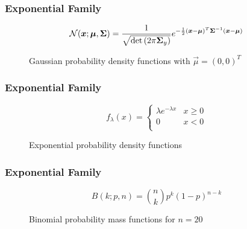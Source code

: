 \begin{frame}
  \frametitle{Exponential Family}

%
  \begin{displaymath}
    \mathcal{N}({\bm x}; {\bm \mu},{\bm \Sigma}) = \frac{1}{ \sqrt{ \det{(2 \pi \ensuremath{{\bm \Sigma}}_y})} } 
                    e^{-\frac{1}{2} ({\bm x} - {\bm \mu})^T {\bm \Sigma}^{-1} ({\bm x} - {\bm \mu})  } 
  \end{displaymath}
%
  \begin{figure}
    \centering
    \subfloat{
      \resizebox{.3\linewidth}{!}{
        
      }
    }
    \quad
    \subfloat{
      \resizebox{.3\linewidth}{!}{
        
      }
    }
    \quad
    \subfloat{
      \resizebox{.3\linewidth}{!}{
        
      }
    }

    \caption{Gaussian probability density functions with $\vec\mu = (0, 0)^T$}
  \end{figure}
\end{frame}


\begin{frame}
  \frametitle{Exponential Family \cont}

%
  \begin{displaymath}
    f_\lambda(x) = \left\{ 
                 \begin{array}{ll}
                   \lambda e^{-\lambda x} & x \ge 0 \\
                   0                      & x < 0 \\
                 \end{array}
               \right.
  \end{displaymath}
%
  \begin{figure}
    \caption{Exponential probability density functions}
  \end{figure}
\end{frame}


\begin{frame}
  \frametitle{Exponential Family \cont}

%
  \begin{displaymath}
    B(k; p,n) = {n \choose k} p^k (1-p)^{n-k}
  \end{displaymath}
%
  \begin{figure}
    \caption{Binomial probability mass functions for $n=20$}
  \end{figure}
\end{frame}



